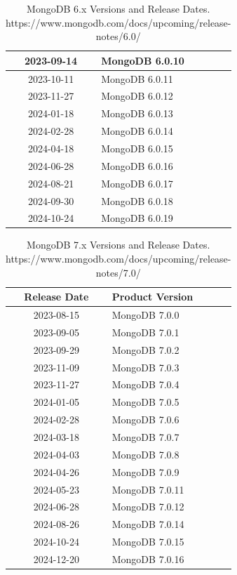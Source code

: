 \documentclass[../main.tex]{subfiles}
\begin{document}
\begin{table}[h]
\begin{minipage}{0.45\textwidth}
\begin{tabular}{|c|l|}
    2023-09-14 & MongoDB 6.0.10 \\ \hline
    2023-10-11 & MongoDB 6.0.11 \\ \hline
    2023-11-27 & MongoDB 6.0.12 \\ \hline
    2024-01-18 & MongoDB 6.0.13 \\ \hline
    2024-02-28 & MongoDB 6.0.14 \\ \hline
    2024-04-18 & MongoDB 6.0.15 \\ \hline
    2024-06-28 & MongoDB 6.0.16 \\ \hline
    2024-08-21 & MongoDB 6.0.17 \\ \hline
    2024-09-30 & MongoDB 6.0.18 \\ \hline
    2024-10-24 & MongoDB 6.0.19 \\ \hline
\end{tabular}
\caption{MongoDB 6.x Versions and Release Dates. https://www.mongodb.com/docs/upcoming/release-notes/6.0/}
\label{table:mongodb_versions}
\end{minipage}
\end{table}

\begin{table}[h]
\centering
\begin{tabular}{|c|l|}
\hline
\textbf{Release Date} & \textbf{Product Version} \\ \hline
    2023-08-15 & MongoDB 7.0.0 \\ \hline
    2023-09-05 & MongoDB 7.0.1 \\ \hline
    2023-09-29 & MongoDB 7.0.2 \\ \hline
    2023-11-09 & MongoDB 7.0.3 \\ \hline
    2023-11-27 & MongoDB 7.0.4 \\ \hline
    2024-01-05 & MongoDB 7.0.5 \\ \hline
    2024-02-28 & MongoDB 7.0.6 \\ \hline
    2024-03-18 & MongoDB 7.0.7 \\ \hline
    2024-04-03 & MongoDB 7.0.8 \\ \hline
    2024-04-26 & MongoDB 7.0.9 \\ \hline
    2024-05-23 & MongoDB 7.0.11 \\ \hline
    2024-06-28 & MongoDB 7.0.12 \\ \hline
    2024-08-26 & MongoDB 7.0.14 \\ \hline
    2024-10-24 & MongoDB 7.0.15 \\ \hline
    2024-12-20 & MongoDB 7.0.16 \\ \hline
\end{tabular}
\caption{MongoDB 7.x Versions and Release Dates. https://www.mongodb.com/docs/upcoming/release-notes/7.0/}
\label{table:mongodb_versions}
\end{table}
\end{document}
